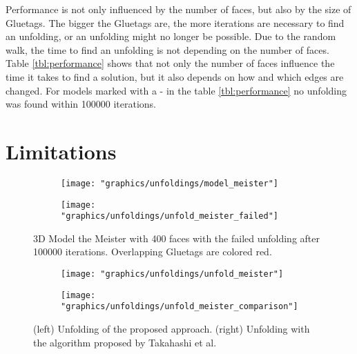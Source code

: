 \documentclass[draft,final]{vutinfth} %
\begin{document}
\label{tbl:performance}
\endgroup

Performance is not only influenced by the number of faces, but also by the size of Gluetags. The bigger the Gluetags are, the more iterations are necessary to find an unfolding, or an unfolding might no longer be possible. Due to the random walk, the time to find an unfolding is not depending on the number of faces. Table \ref{tbl:performance} shows that not only the number of faces influence the time it takes to find a solution, but it also depends on how and which edges are changed. For models marked with a - in the table \ref{tbl:performance} no unfolding was found within 100000 iterations.



\section{Limitations}
\label{sec:limitations}

\begin{figure}
  \begin{subfigure}[b]{0.5\textwidth}
    \texttt{[image: "graphics/unfoldings/model\_meister"]}
  \end{subfigure}
  \begin{subfigure}[b]{0.5\textwidth}
    \texttt{[image: "graphics/unfoldings/unfold\_meister\_failed"]}
  \end{subfigure}
  
  \caption{3D Model the Meister with 400 faces with the failed unfolding after 100000 iterations. Overlapping Gluetags are colored red.}
  \label{fig:meister_failed}
\end{figure}

\begin{figure}
  \begin{subfigure}[b]{0.5\textwidth}
    \texttt{[image: "graphics/unfoldings/unfold\_meister"]}
  \end{subfigure}
  \begin{subfigure}[b]{0.5\textwidth}
    \texttt{[image: "graphics/unfoldings/unfold\_meister\_comparison"]}
  \end{subfigure}
  
  \caption{(left) Unfolding of the proposed approach. (right) Unfolding with the algorithm proposed by Takahashi et al.\cite{takahashi2011optimized}}
  \label{fig:meister_comparison}
\end{figure}
\end{document}
